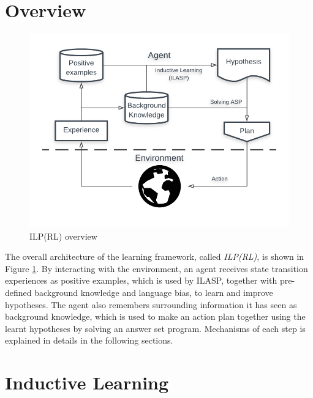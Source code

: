 \section{Overview}
\label{sec:overview}

\begin{figure}[!htb]
\centering
\includegraphics[width=1.0\textwidth]{./figures/architecture}
\caption{ILP(RL) overview}
\label{fig:ILPRL_overview}
\end{figure}

The overall architecture of the learning framework, called \textit{ILP(RL)}, is shown in Figure \ref{fig:ILPRL_overview}. 
By interacting with the environment, an agent receives state transition experiences as positive examples, which is used by ILASP, together with pre-defined background knowledge and language bias, to learn and improve hypotheses.
The agent also remembers surrounding information it has seen as background knowledge, which is used to make an action plan together using the learnt hypotheses by solving an answer set program.
Mechanisms of each step is explained in details in the following sections.

\section{Inductive Learning}
\label{sec:inductive_learning}


